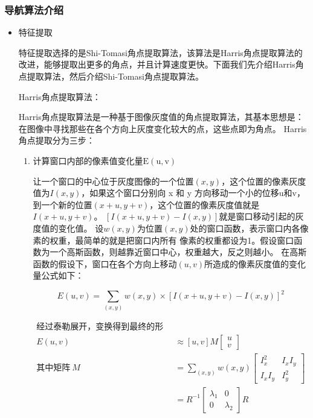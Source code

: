 \subsubsection{导航算法介绍}
\begin{itemize}
    \item 特征提取
    
    特征提取选择的是Shi-Tomasi角点提取算法，该算法是Harris角点提取算法的改进，能够提取出更多的角点，并且计算速度更快\cite{shi1994good}。下面我们先介绍Harris角点提取算法，然后介绍Shi-Tomasi角点提取算法。
    
    Harris角点提取算法：
    
    Harris角点提取算法是一种基于图像灰度值的角点提取算法，其基本思想是：在图像中寻找那些在各个方向上灰度变化较大的点，这些点即为角点。
    Harris角点提取分为三步：
    \begin{enumerate}
        \item 计算窗口内部的像素值变化量\(\mathrm{E(u,v)}\)
        
        让一个窗口的中心位于灰度图像的一个位置$(x,y)$，这个位置的像素灰度值为$I(x,y)$，如果这个窗口分别向 x 和 y 方向移动一个小的位移u和v，到一个新的位置$(x+u,y+v)$，这个位置的像素灰度值就是$I(x+u,y+v)$。
        $[I(x+u,y+v)-I(x,y)]$就是窗口移动引起的灰度值的变化值。
        设$w(x,y)$为位置$(x,y)$处的窗口函数，表示窗口内各像素的权重，最简单的就是把窗口内所有
        像素的权重都设为1。假设窗口函数为一个高斯函数，则越靠近窗口中心，权重越大，反之则越小。
        在高斯函数的假设下，窗口在各个方向上移动$(u,v)$所造成的像素灰度值的变化量公式如下：

        \[E(u,v)=\sum_{(x,y)}w(x,y)\times[I(x+u,y+v)-I(x,y)]^2\]
        
        \begin{align*}
        \text{经过泰勒展开，变换得到最终的形式：} \\
        E(u,v) &\approx [u,v]M\begin{bmatrix} u \\ v \end{bmatrix} \\
        \text{其中矩阵}~M &=\sum_{(x,y)}w(x,y)
        \begin{bmatrix}
        I_x^2 & I_xI_y \\
        I_xI_y & I_y^2
        \end{bmatrix} \\
        &= R^{-1}
        \begin{bmatrix}
        \lambda_1 & 0 \\
        0 & \lambda_2
        \end{bmatrix}R
        \end{align*}


\end{enumerate}
\end{itemize}
